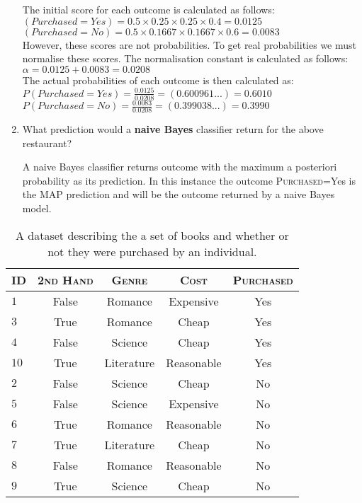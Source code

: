 \documentclass[solution]{ditpaper}
\begin{document}
\begin{enumerate}
\begin{center}
		\end{center}
		\begin{answer}
		The initial score for each outcome is calculated as follows:\\
		$(Purchased=Yes) =  0.5 \times 0.25 \times 0.25 \times 0.4 = 0.0125$\\
		$(Purchased=No) =  0.5 \times 0.1667 \times 0.1667 \times 0.6 = 0.0083$\\
		However, these scores are not probabilities. To get real probabilities we must normalise these scores. The normalisation constant is calculated as follows:\\
		$\alpha=0.0125+0.0083=0.0208$\\
		The actual probabilities of each outcome is then calculated as:
		$P(Purchased=Yes) =  \frac{0.0125}{0.0208}=(0.600961...)=0.6010$ \\
		$P(Purchased=No) =  \frac{0.0083}{0.0208}=(0.399038...)=0.3990$\\
		\end{answer}
		\item What prediction would a \textbf{naive Bayes} classifier return for the 	above restaurant?			
		\begin{answer}
		A naive Bayes classifier returns outcome with the maximum a posteriori probability as its prediction. In this instance the outcome \textsc{Purchased}=Yes is the MAP prediction and will be the outcome returned by a naive Bayes model.
		\end{answer} 
\end{enumerate}
\begin{table}[h]
\begin{center}
\caption{A dataset describing the a set of books and whether or not they were purchased by an individual.}
\label{tab:rest}
\vspace{0.5em}
\begin{tabular}{lcccc}
\hline
 ID & \textsc{2nd Hand} & \textsc{Genre} & \textsc{Cost} & \textsc{Purchased} \\
\hline
$1$  & False & Romance & Expensive &  Yes\\
$3$    & True & Romance & Cheap &   Yes\\
$4$    & False & Science & Cheap &   Yes\\
$10$ & True & Literature & Reasonable &   Yes\\
$2$    & False & Science & Cheap &   No\\
$5$    & False & Science & Expensive &   No\\
$6$    & True & Romance & Reasonable &   No\\
$7$    & True & Literature & Cheap &   No\\
$8$    & False & Romance & Reasonable &   No\\
$9$     & True & Science & Cheap &   No\\
\hline
\end{tabular}
\end{center}
\end{table}
\end{document}
